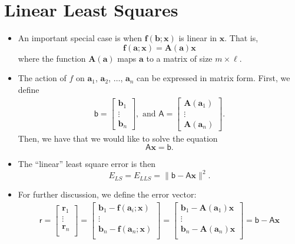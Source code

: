 \documentclass[10pt]{article}
\newcommand{\ve}[1]{\mathbf{#1}}
\newcommand{\msf}[1]{\mathsf{#1}}
\begin{document}
  \section{Linear Least Squares}
  
  \begin{itemize}        
    \item An important special case is when $\ve{f}(\ve{b}; \ve{x})$ is 
    linear in $\ve{x}$. That is,
      $$\ve{f}(\ve{a}; \ve{x}) = \ve{A}(\ve{a})\ve{x}$$
      where the function $\ve{A}(\ve{a})$ maps $\ve{a}$ to a 
      matrix of size $m \times \ell$.
      
    \item The action of $f$ on $\ve{a}_1$, $\ve{a}_2$, $\dots$, 
    $\ve{a}_n$ can be expressed in matrix form. First, we define
    \begin{align*}
        \mathsf{b} = 
        \begin{bmatrix}
          \ve{b}_1\\
          \vdots\\
          \ve{b}_n
        \end{bmatrix},
        \mbox{ and }
        \mathsf{A} =
        \begin{bmatrix}
          \ve{A}(\ve{a}_1)\\
          \vdots\\
          \ve{A}(\ve{a}_n)
        \end{bmatrix}.
      \end{align*}
    Then, we have that we would like to
    solve the equation $$\msf{A}\ve{x} = \msf{b}.$$
    
    \item The ``linear'' least square error is then
      $$E_{LS} = E_{LLS} = \| \msf{b} - \mathsf{A} \ve{x} \|^2.$$
      
    \item For further discussion, we define the error vector:
      \begin{align*}
        \msf{r}
        = \begin{bmatrix}
          \ve{r}_1 \\
          \vdots\\
          \ve{r}_n \\
        \end{bmatrix}
        = \begin{bmatrix}
          \ve{b}_1 - \ve{f}(\ve{a}_i; \ve{x}) \\
          \vdots\\
          \ve{b}_n - \ve{f}(\ve{a}_n; \ve{x}) \\
        \end{bmatrix}
        = \begin{bmatrix}
          \ve{b}_1 - \ve{A}(\ve{a}_1) \ve{x} \\
          \vdots\\
          \ve{b}_n - \ve{A}(\ve{a}_n) \ve{x} \\
        \end{bmatrix}
        = \msf{b} - \msf{A} \ve{x}
      \end{align*}
      

\end{itemize}
\end{document}
